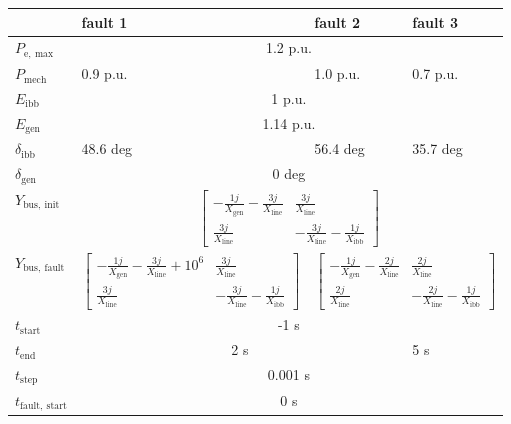 \begin{centering}
    \small
    \begin{tabularx}{\textwidth}{l|X|l|l}
        & fault 1 & fault 2 & fault 3 \\ \hline \hline
        $P_\mathrm{e,~max}$     & \multicolumn{3}{c}{1.2 p.u.} \\ \hline
        $P_\mathrm{mech}$       & 0.9 p.u. & 1.0 p.u. & 0.7 p.u. \\ \hline
        $E_\mathrm{ibb}$        & \multicolumn{3}{c}{1 p.u.} \\ \hline
        $E_\mathrm{gen}$        & \multicolumn{3}{c}{1.14 p.u.} \\ \hline
        $\delta_\mathrm{ibb}$   & 48.6 deg & 56.4 deg & 35.7 deg \\ \hline
        $\delta_\mathrm{gen}$   & \multicolumn{3}{c}{0 deg} \\ \hline

        $Y_\mathrm{bus,~init}$ & \multicolumn{3}{c}{$\begin{bmatrix} -\frac{1j}{X_\mathrm{gen}}-\frac{3j}{X_\mathrm{line}} & \frac{3j}{X_\mathrm{line}} \\ \frac{3j}{X_\mathrm{line}} & -\frac{3j}{X_\mathrm{line}}-\frac{1j}{X_\mathrm{ibb}}\end{bmatrix}$} \\ \hline

        $Y_\mathrm{bus,~fault}$ & $\begin{bmatrix} -\frac{1j}{X_\mathrm{gen}}-\frac{3j}{X_\mathrm{line}} + 10^6 & \frac{3j}{X_\mathrm{line}} \\ \frac{3j}{X_\mathrm{line}} & -\frac{3j}{X_\mathrm{line}}-\frac{1j}{X_\mathrm{ibb}}\end{bmatrix}$ 
        & \multicolumn{2}{c}{$\begin{bmatrix} -\frac{1j}{X_\mathrm{gen}}-\frac{2j}{X_\mathrm{line}} & \frac{2j}{X_\mathrm{line}} \\ \frac{2j}{X_\mathrm{line}} & -\frac{2j}{X_\mathrm{line}}-\frac{1j}{X_\mathrm{ibb}}\end{bmatrix}$} \\ \hline \hline

        $t_\mathrm{start}$      & \multicolumn{3}{c}{-1 s} \\ \hline
        $t_\mathrm{end}$        & \multicolumn{2}{c|}{2 s} & 5 s \\ \hline
        $t_\mathrm{step}$       & \multicolumn{3}{c}{0.001 s} \\ \hline
        $t_\mathrm{fault,~start}$   & \multicolumn{3}{c}{0 s} \\
    \end{tabularx}
\end{centering}

